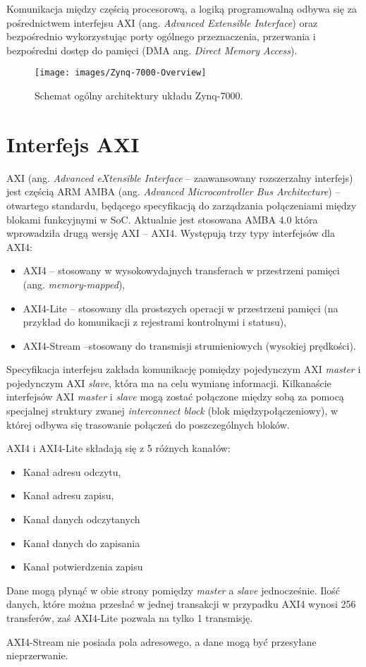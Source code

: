 Komunikacja między częścią procesorową, a logiką programowalną odbywa się za pośrednictwem interfejsu AXI (ang. \textit{Advanced Extensible Interface}) oraz bezpośrednio wykorzystując porty ogólnego przeznaczenia, przerwania i bezpośredni dostęp do pamięci (DMA ang. \textit{Direct Memory Access}).

\begin{figure}[h]
    \centering
    \texttt{[image: images/Zynq-7000-Overview]}
    \caption{Schemat ogólny architektury układu Zynq-7000.}
    \label{fig:zynq7000}
\end{figure}

\section{Interfejs AXI}
 AXI (ang. \textit{Advanced eXtensible Interface} --  zaawansowany rozszerzalny interfejs) jest częścią ARM AMBA (ang.\textit{ Advanced Microcontroller Bus Architecture}) -- otwartego standardu, będącego specyfikacją do zarządzania połączeniami między blokami funkcyjnymi w SoC. 
 Aktualnie jest stosowana AMBA 4.0 która wprowadziła drugą wersję AXI -- AXI4. 
 Występują trzy typy interfejsów dla AXI4:
\begin{itemize}
\item AXI4 -- stosowany w wysokowydajnych transferach w przestrzeni pamięci (ang. \textit{memory-mapped}),
\item AXI4-Lite -- stosowany dla prostszych operacji w przestrzeni pamięci (na przykład do komunikacji z rejestrami kontrolnymi i statusu),
\item AXI4-Stream --stosowany do transmisji strumieniowych (wysokiej prędkości). 
\end{itemize}
Specyfikacja interfejsu zakłada komunikację pomiędzy pojedynczym AXI \textit{master} i pojedynczym AXI \textit{slave}, która ma na celu wymianę informacji. 
Kilkanaście interfejsów AXI \textit{master} i \textit{slave} mogą zostać połączone między sobą za pomocą specjalnej struktury zwanej \textit{interconnect block} (blok międzypołączeniowy), w której odbywa się trasowanie połączeń do poszczególnych bloków. 

AXI4 i AXI4-Lite składają się z 5 różnych kanałów:
\begin{itemize}
\item Kanał adresu odczytu,
\item Kanał adresu zapisu,
\item Kanał danych odczytanych
\item Kanał danych do zapisania
\item Kanał potwierdzenia zapisu
\end{itemize}
Dane mogą płynąć w obie strony pomiędzy \textit{master} a \textit{slave} jednocześnie.
Ilość danych, które można przesłać w jednej transakcji w przypadku AXI4 wynosi 256 transferów, zaś AXI4-Lite pozwala na tylko 1 transmisję.



AXI4-Stream nie posiada pola adresowego, a dane mogą być przesyłane nieprzerwanie. 